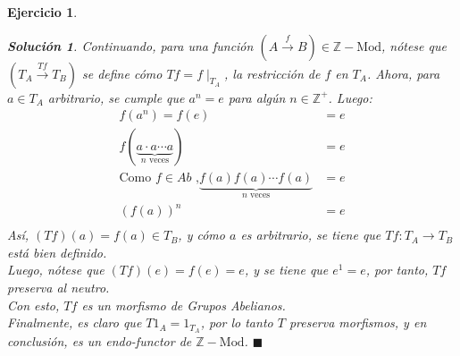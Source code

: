 \documentclass[12pt,letterpaper,titlepage]{article}
\newcommand{\xqed}[1]{%
  \leavevmode\unskip\penalty9999 \hbox{}\nobreak\hfill
  \quad\hbox{\ensuremath{#1}}}
\newtheorem{exe}{Ejercicio}
\theoremstyle{definition}
\newtheorem*{soltemp}{Solución}
\newenvironment{sol}[1]{%
    \begin{soltemp}#1}{%
    \xqed{\blacksquare}\end{soltemp}%
}
\newcommand\Z{\mathbb Z}
\newcommand\<{\langle}
\renewcommand\>{\rangle}
\begin{document}
\begin{exe}
\begin{sol}
    Continuando, para una función $(A\overset{f}{\to}B)\in \Z-\mathrm{Mod}$, nótese que $(T_A\overset{Tf}{\to}T_B)$ se define cómo $Tf=f\mid_{T_A}$, la restricción de $f$ en $T_A$.
    Ahora, para $a\in T_A$ arbitrario, se cumple que $a^n=e$ para algún $n\in\Z^+$. Luego:
    \begin{align*}
        f(a^n) = f(e) & = e \\
        f\left(\underbrace{a\cdot a \cdots a}_{n \text{ veces}}\right) & = e \\
        \text{Como $f\in Ab$ ,} \underbrace{f(a)f(a)\cdots f(a)}_{n\text{ veces}} & = e \\
        \left(f(a)\right)^n & = e\\
    \end{align*}
    Así, $(Tf)(a)=f(a)\in T_B$, y cómo $a$ es arbitrario, se tiene que $Tf:T_A\to T_B$ está bien definido.\\
    Luego, nótese que $(Tf)(e)=f(e)=e$, y se tiene que $e^1 = e$, por tanto, $Tf$ preserva al neutro.\\
    Con esto, $Tf$ es un morfismo de Grupos Abelianos.\\
    Finalmente, es claro que $T1_A=1_{T_A}$, por lo tanto $T$ preserva morfismos, y en conclusión, es un endo-functor de $\Z-\mathrm{Mod}$. 
\end{sol}
    \end{exe}
\end{document}
